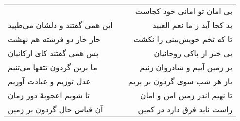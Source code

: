 \begin{center}
\begin{longtable}{l p{0.5cm} r}
&&
بی امان تو امانی خود کجاست
\\
این همی گفتند و دلشان می‌طپید
&&
بد کجا آید ز ما نعم العبید
\\
خار خار دو فرشته هم نهشت
&&
تا که تخم خویش‌بینی را نکشت
\\
پس همی گفتند کای ارکانیان
&&
بی خبر از پاکی روحانیان
\\
ما برین گردون تتقها می‌تنیم
&&
بر زمین آییم و شادروان زنیم
\\
عدل توزیم و عبادت آوریم
&&
باز هر شب سوی گردون بر پریم
\\
تا شویم اعجوبهٔ دور زمان
&&
تا نهیم اندر زمین امن و امان
\\
آن قیاس حال گردون بر زمین
&&
راست ناید فرق دارد در کمین
\\
\end{longtable}
\end{center}
